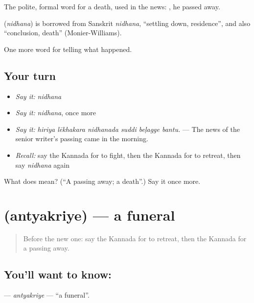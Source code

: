 The polite, formal word for a death, used in the news:  , he passed away.

\begin{cousinweb}
\textbf{} (\emph{nidhana}) is borrowed from Sanskrit \emph{nidhana}, \textquotedblleft{}settling down, residence\textquotedblright{}, and also \textquotedblleft{}conclusion, death\textquotedblright{} (Monier-Williams).
\end{cousinweb}

\begin{grammarlens}[title={What you've built}]
One more word for telling what happened.
\end{grammarlens}

\subsection*{Your turn}
\begin{itemize}
\raggedright
  \item \emph{Say it:} \emph{nidhana}
  \item \emph{Say it:} \emph{nidhana}, once more
  \item \emph{Say it:} \emph{hiriya lēkhakara nidhanada suddi beḷagge bantu.} — The news of the senior writer's passing came in the morning.
  \item \emph{Recall:} say the Kannada for to fight, then the Kannada for to retreat, then say \emph{nidhana} again
\end{itemize}

\begin{tcolorbox}[breakable,colback=teal!4,colframe=teal!35!black,title={Before you move on}]
What does  mean? (\textquotedblleft{}A passing away; a death\textquotedblright{}.) Say it once more.
\end{tcolorbox}
\section[\texorpdfstring{\kn{ಅಂತ್ಯಕ್ರಿಯೆ} (antyakriye)}{ಅಂತ್ಯಕ್ರಿಯೆ (antyakriye)}]{ (antyakriye) — a funeral}

\label{lesson:KA-C337-antyakriye}



\begin{quote}
Before the new one: say the Kannada for to retreat, then the Kannada for a passing away.
\end{quote}

\subsection*{You'll want to know: }
\textbf{} — \emph{antyakriye} — \textquotedblleft{}a funeral\textquotedblright{}.

